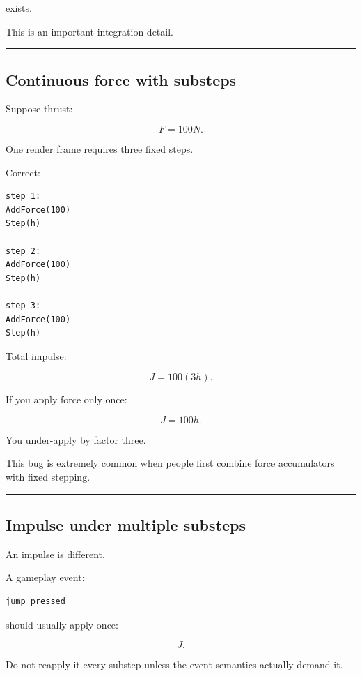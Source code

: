 exists.

This is an important integration detail.

\begin{center}\rule{0.5\linewidth}{0.5pt}\end{center}

\subsection{Continuous force with substeps}\label{06-engine-ii-ch037-continuous-force-with-substeps}

Suppose thrust:

\[
F=100N.
\]

One render frame requires three fixed steps.

Correct:

\begin{verbatim}
step 1:
AddForce(100)
Step(h)

step 2:
AddForce(100)
Step(h)

step 3:
AddForce(100)
Step(h)
\end{verbatim}

Total impulse:

\[
J
=
100(3h).
\]

If you apply force only once:

\[
J
=
100h.
\]

You under-apply by factor three.

This bug is extremely common when people first combine force accumulators with fixed stepping.

\begin{center}\rule{0.5\linewidth}{0.5pt}\end{center}

\subsection{Impulse under multiple substeps}\label{06-engine-ii-ch037-impulse-under-multiple-substeps}

An impulse is different.

A gameplay event:

\begin{verbatim}
jump pressed
\end{verbatim}

should usually apply once:

\[
J.
\]

Do not reapply it every substep unless the event semantics actually demand it.

